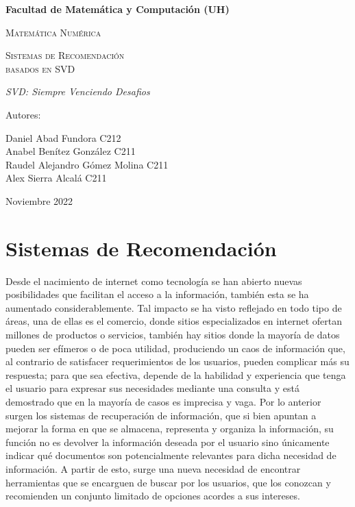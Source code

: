 \documentclass{article}
\begin{document}
\begin{titlepage}
\centering
{\bfseries\LARGE Facultad de Matemática y Computación (UH) \par}
\vspace{1cm}
{\scshape\Large Matemática Numérica \par}
\vspace{3cm}
{\scshape\Huge Sistemas de Recomendación \\basados en SVD \par}
\vspace{3cm}
{\itshape\Large SVD: Siempre Venciendo Desafios \par}
\vfill
{\Large Autores: \par}
{\Large Daniel Abad Fundora C212\\
		Anabel Benítez González C211\\
		Raudel Alejandro Gómez Molina C211\\
		Alex Sierra Alcalá C211\\ \par}
\vfill
{\Large Noviembre 2022 \par}
\end{titlepage}

\section{Sistemas de Recomendación}

Desde el nacimiento de internet como tecnología se han abierto nuevas posibilidades que facilitan el acceso a la información, también esta se ha aumentado considerablemente. Tal impacto se ha visto reflejado en todo tipo de áreas, una de ellas es el comercio, donde sitios especializados en internet ofertan millones de productos o servicios, también hay sitios donde la 
mayoría de datos pueden ser efímeros o de poca utilidad, produciendo un caos de información que, al contrario de satisfacer requerimientos de los usuarios, pueden complicar más su respuesta; para que sea efectiva, depende de la habilidad y experiencia que tenga el usuario para expresar sus necesidades mediante una consulta y está demostrado que en la mayoría de casos es imprecisa y vaga. Por lo anterior surgen los sistemas de recuperación de información, que si bien apuntan a mejorar la forma en que se almacena, representa y organiza la información, su función no es devolver la información deseada por el usuario sino únicamente indicar qué documentos son potencialmente relevantes para dicha necesidad de información. A partir de esto, surge una nueva necesidad de encontrar herramientas que se encarguen de buscar por los usuarios, que los conozcan y recomienden un conjunto limitado de opciones acordes a sus intereses. 
\end{document}

